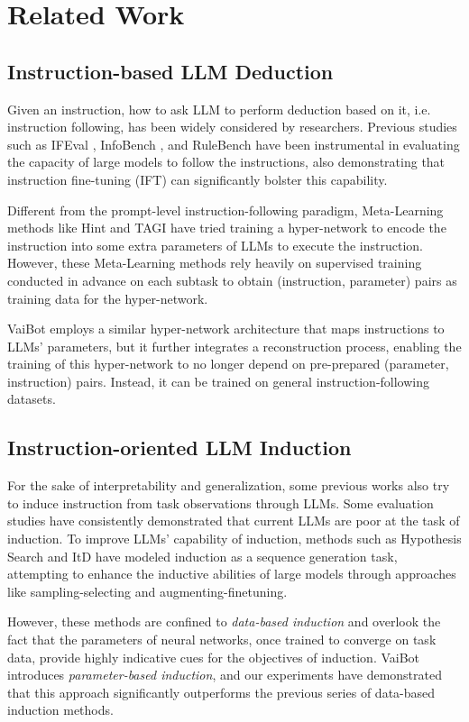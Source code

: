 \section{Related Work}
\label{sec:related_work}
\subsection{Instruction-based LLM Deduction}
\label{sec:deduction_related_work}
Given an instruction, how to ask LLM to perform deduction based on it, i.e. instruction following, has been widely considered by researchers. Previous studies such as IFEval \cite{instruction-following-eval}, InfoBench \cite{qin2024infobench}, and RuleBench \cite{sun2024beyond} have been instrumental in evaluating the capacity of large models to follow the instructions, also demonstrating that instruction fine-tuning (IFT) can significantly bolster this capability. 

Different from the prompt-level instruction-following paradigm, Meta-Learning methods like Hint \cite{ivison-etal-2023-hint} and TAGI \cite{liao2024instance} have tried training a hyper-network to encode the instruction into some extra parameters of LLMs to execute the instruction. However, these Meta-Learning methods rely heavily on supervised training conducted in advance on each subtask to obtain (instruction, parameter) pairs as training data for the hyper-network.

VaiBot employs a similar hyper-network architecture that maps instructions to LLMs' parameters, but it further integrates a reconstruction process, enabling the training of this hyper-network to no longer depend on pre-prepared (parameter, instruction) pairs. Instead, it can be trained on general instruction-following datasets.

\subsection{Instruction-oriented LLM Induction}
\label{sec:induction_related_work}
For the sake of interpretability and generalization, some previous works also try to induce instruction from task observations through LLMs. Some evaluation studies \cite{eval1, eval2, mitchell2023comparing} have consistently demonstrated that current LLMs are poor at the task of induction. To improve LLMs' capability of induction, methods such as Hypothesis Search \cite{wang2023hypothesis} and ItD \cite{sun2024itd} have modeled induction as a sequence generation task, attempting to enhance the inductive abilities of large models through approaches like sampling-selecting and augmenting-finetuning.

However, these methods are confined to \emph{data-based induction} and overlook the fact that the parameters of neural networks, once trained to converge on task data, provide highly indicative cues for the objectives of induction. VaiBot introduces \emph{parameter-based induction}, and our experiments have demonstrated that this approach significantly outperforms the previous series of data-based induction methods.